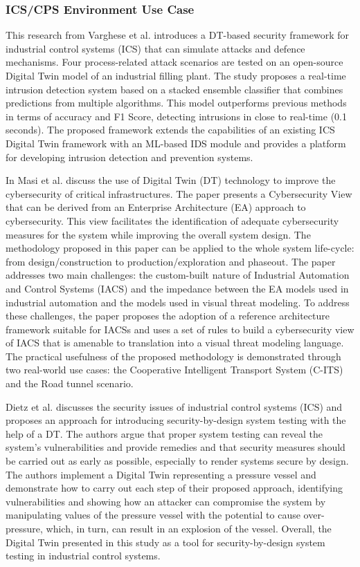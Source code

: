 \subsubsection*{ICS/CPS Environment Use Case}

This \cite{vargheseDigitalTwinbasedIntrusion2022} research from Varghese et al. introduces a DT-based security framework for industrial control systems (ICS) that can simulate attacks and defence mechanisms. Four process-related attack scenarios are tested on an open-source Digital Twin model of an industrial filling plant. The study proposes a real-time intrusion detection system based on a stacked ensemble classifier that combines predictions from multiple algorithms. This model outperforms previous methods in terms of accuracy and F1 Score, detecting intrusions in close to real-time (0.1 seconds). The proposed framework extends the capabilities of an existing ICS Digital Twin framework with an ML-based IDS module and provides a platform for developing intrusion detection and prevention systems.


In\cite{masiSecuringCriticalInfrastructures2023} Masi et al. discuss the  use of Digital Twin (DT) technology to improve the cybersecurity of critical infrastructures. The paper presents a Cybersecurity View that can be derived from an Enterprise Architecture (EA) approach to cybersecurity. This view facilitates the identification of adequate cybersecurity measures for the system while improving the overall system design. The methodology proposed in this paper can be applied to the whole system life-cycle: from design/construction to production/exploration and phaseout. The paper addresses two main challenges: the custom-built nature of Industrial Automation and Control Systems (IACS) and the impedance between the EA models used in industrial automation and the models used in visual threat modeling. To address these challenges, the paper proposes the adoption of a reference architecture framework suitable for IACSs and uses a set of rules to build a cybersecurity view of IACS that is amenable to translation into a visual threat modeling language.  The practical usefulness of the proposed methodology is demonstrated through two real-world use cases: the Cooperative Intelligent Transport System (C-ITS) and the Road tunnel scenario. 

Dietz et al.\cite{dietzEmployingDigitalTwins2022} discusses the security issues of industrial control systems (ICS) and proposes an approach for introducing security-by-design system testing with the help of a DT. The authors argue that proper system testing can reveal the system’s vulnerabilities and provide remedies and that security measures should be carried out as early as possible, especially to render systems secure by design. The authors implement a Digital Twin representing a pressure vessel and demonstrate how to carry out each step of their proposed approach, identifying vulnerabilities and showing how an attacker can compromise the system by manipulating values of the pressure vessel with the potential to cause over-pressure, which, in turn, can result in an explosion of the vessel. Overall, the Digital Twin presented in this study as a tool for security-by-design system testing in industrial control systems.


